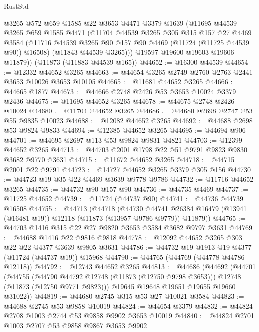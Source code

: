 \begin{lexlean}{RustStd}
\begin{coremodule}
        @3265
        @572
        @659
        @1585
        @22
        @3653
        @4471
        @3379
        @1639
        (@11695
          @44539
          @3265
          @659
          @1585
          @4471
          (@11704
            @44539
            @3265
            @305
            @315
            @157
            @27
            @4469
            @3584
            (@11716 @44539 @3265 @90 @157 @90 @4469 (@11724 (@11725 @44539 @90)) @16508)
            (@11843 @44539 @3265)))
        @19597
        @19600
        @19603
        @19606
        @11879))
    (@11873 (@11883 @44539 @165))
@44652 := @16300 @44539
@44654 := @12332 @44652 @3265
@44663 := @44654 @3265 @2749 @2760 @2763 @2441 @3653 @10026 @3653 @10105
@44665 := @11681 @44652 @3265
@44666 := @44665 @1877
@44673 := @44666 @2748 @2426 @53 @3653 @10024 @3379 @2436
@44675 := @11695 @44652 @3265
@44678 := @44675 @2748 @2426 @10024
@44680 := @11704 @44652 @3265
@44686 := @44680 @2698 @2747 @53 @55 @9835 @10023
@44688 := @12082 @44652 @3265
@44692 := @44688 @2698 @53 @9824 @9833
@44694 := @12385 @44652 @3265
@44695 := @44694 @906
@44701 := @44695 @2697 @113 @53 @9824 @9831 @4821
@44703 := @12399 @44652 @3265
@44713 := @44703 @2001 @1798 @22 @51 @9791 @9823 @9830 @3682 @9770 @3631
@44715 := @11672 @44652 @3265
@44718 := @44715 @2001 @22 @9791
@44723 := @14727 @44652 @3265 @3379 @305 @156
@44730 := @44723 @19 @35 @22 @4469 @3639 @9778 @9786
@44732 := @11716 @44652 @3265
@44735 := @44732 @90 @157 @90
@44736 := @44735 @4469
@44737 := @11725 @44652
@44739 := @11724 (@44737 @90)
@44741 := @44736 @44739 @16508
@44755 := @44713
    (@44718
      (@44730
        @44741
        @26384
        @16479
        (@13941 (@16481 @19))
        @12118
        (@11873 (@13957 @9786 @9779))
        @11879))
@44765 := @44703 @1416 @315 @22 @27 @9820 @3653 @3584 @3682 @9797 @3631
@44769 := @44688 @1416 @22 @9816 @9818
@44778 := @12092 @44652 @3265 @303 @22 @22 @4377 @3639 @9805 @3631
@44786 := @44732 @19 @1913 @19 @4377 (@11724 (@44737 @19)) @15968
@44790 := @44765 (@44769 (@44778 @44786 @12118))
@44792 := @12743 @44652 @3265
@44813 := @44686
    (@44692
      (@44701
        (@44755
          (@44790 @44792 @12748 (@11873 (@12750 @9798 @3653)))
          @12748
          (@11873 (@12750 @9771 @9823)))
        @19645
        @19648
        @19651
        @19655
        @19660
        @31022))
@44819 := @44680 @2745 @315 @53 @27 @10021 @3584
@44823 := @44688 @2745 @53 @9858 @10019
@44824 := @44654 @3379
@44832 := @44824 @2708 @1003 @2744 @53 @9858 @9902 @3653 @10019
@44840 := @44824 @2701 @1003 @2707 @53 @9858 @9867 @3653 @9902

\end{coremodule}
\end{lexlean}
